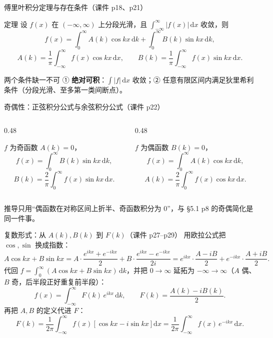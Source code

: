 \documentclass[aspectratio=169,10pt]{beamer}
\newcommand{\bhl}[1]{{\color{mid}\bfseries #1}}
\begin{document}
\begin{frame}{傅里叶积分定理与存在条件（课件 p18、p21）}
  \begin{block}{定理}
    \small 设 $f(x)$ 在 $(-\infty,\infty)$ 上分段光滑，且 $\int_{-\infty}^{\infty}|f(x)|\,\mathrm{d}x$ 收敛，则
    \[
      f(x)=\int_{0}^{\infty}A(k)\cos kx\,\mathrm{d}k+\int_{0}^{\infty}B(k)\sin kx\,\mathrm{d}k,
    \]
    \[
      A(k)=\frac{1}{\pi}\int_{-\infty}^{\infty}f(x)\cos kx\,\mathrm{d}x,\qquad
      B(k)=\frac{1}{\pi}\int_{-\infty}^{\infty}f(x)\sin kx\,\mathrm{d}x .
    \]
  \end{block}
  \vspace{2pt}
  \begin{block}{两个条件缺一不可}
    \small \hspace{0.02em}① \bhl{绝对可积}：$\int|f|\,\mathrm{d}x$ 收敛；② 任意有限区间内满足狄里希利条件（分段光滑、至多第一类间断点）。
  \end{block}
\end{frame}

\begin{frame}{奇偶性：正弦积分公式与余弦积分公式（课件 p22）}
  \begin{columns}[t]
    \begin{column}{0.48\textwidth}
      \begin{block}{$f$ 为奇函数}
        \small $A(k)=0$，
        \[ f(x)=\int_{0}^{\infty}B(k)\sin kx\,\mathrm{d}k, \]
        \[ B(k)=\frac{2}{\pi}\int_{0}^{\infty}f(x)\sin kx\,\mathrm{d}x . \]
      \end{block}
    \end{column}
    \begin{column}{0.48\textwidth}
      \begin{block}{$f$ 为偶函数}
        \small $B(k)=0$，
        \[ f(x)=\int_{0}^{\infty}A(k)\cos kx\,\mathrm{d}k, \]
        \[ A(k)=\frac{2}{\pi}\int_{0}^{\infty}f(x)\cos kx\,\mathrm{d}x . \]
      \end{block}
    \end{column}
  \end{columns}
  \vspace{6pt}
  {\small 推导只用“偶函数在对称区间上折半、奇函数积分为 0”，与 §5.1 p8 的奇偶简化是同一件事。}
\end{frame}

\begin{frame}{复数形式：从 $A(k),B(k)$ 到 $F(k)$（课件 p27--p29）}
  {\small 用欧拉公式把 $\cos,\sin$ 换成指数：}
  \[
    A\cos kx+B\sin kx=A\cdot\frac{e^{ikx}+e^{-ikx}}{2}+B\cdot\frac{e^{ikx}-e^{-ikx}}{2i}
    =e^{ikx}\cdot\frac{A-iB}{2}+e^{-ikx}\cdot\frac{A+iB}{2}.
  \]
  {\small 代回 $f=\int_0^\infty(A\cos kx+B\sin kx)\,\mathrm{d}k$，并把 $0\to\infty$ 延拓为 $-\infty\to\infty$（$A$ 偶、$B$ 奇，后半段正好重复前半段）：}
  \[
    f(x)=\int_{-\infty}^{\infty}F(k)\,e^{ikx}\,\mathrm{d}k,
    \qquad F(k)=\frac{A(k)-iB(k)}{2}.
  \]
  {\small 再把 $A,B$ 的定义代进 $F$：}
  \[
    F(k)=\frac{1}{2\pi}\int_{-\infty}^{\infty}f(x)\left[\cos kx-i\sin kx\right]\mathrm{d}x
    =\frac{1}{2\pi}\int_{-\infty}^{\infty}f(x)\,e^{-ikx}\,\mathrm{d}x .
  \]
\end{frame}
\end{document}
